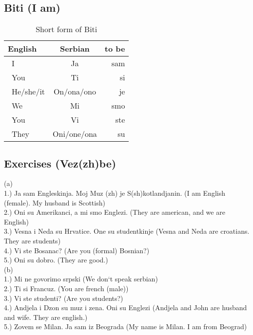 \documentclass[12pt,
               a4paper,
               article,
               oneside,
               english,oldfontcommands]{memoir}
\newcommand{\spaze}{\vspace{4mm}\\}
\begin{document}
  \subsection*{Biti (I am)}
  \begin{table}[H]
    \begin{center}
      \caption{Short form of Biti}
      \begin{tabular}{l|S|r}
        \toprule %
        \textbf{English} & \textbf{Serbian} & \textbf{to be}\\
        \midrule %
        \ I  & Ja & sam\\[4pt]
        \ You & Ti & si\\[4pt]
        \ He/she/it & On/ona/ono & je\\[4pt]
        \ We & Mi  & smo \\[4pt]
        \ You & Vi  & ste \\[4pt]
        \ They & {Oni/one/ona}  & su \\[4pt]
        \bottomrule %
      \end{tabular}
    \end{center}
  \end{table}
\subsection*{Exercises (Vez(zh)be)} 
(a) \spaze 
1.) Ja sam Engleskinja. Moj Muz (zh) je S(sh)kotlandjanin. (I am English (female). My husband is Scottish) \spaze 
2.) Oni su Amerikanci, a mi smo Englezi. (They are american, and we are English) \spaze 
3.) Vesna i Neda su Hrvatice. One su studentkinje (Vesna and Neda are croatians. They are students) \spaze 
4.) Vi ste Bosanac? (Are you (formal) Bosnian?) \spaze 
5.) Oni su dobro. (They are good.) \spaze 
(b) \spaze 
1.) Mi ne govorimo srpski (We don`t speak serbian) \spaze 
2.) Ti si Francuz. (You are french (male)) \spaze 
3.) Vi ste studenti? (Are you students?) \spaze 
4.) Andjela i Dzon su muz i zena. Oni su Englezi (Andjela and John are husband and wife. They are english.) \spaze 
5.) Zovem se Milan. Ja sam iz Beograda (My name is Milan. I am from Beograd) \spaze 
\end{document}
